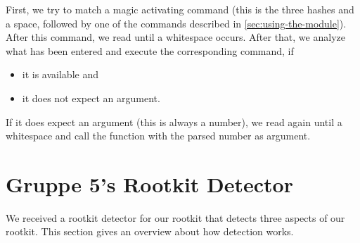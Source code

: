 \documentclass[10pt, letterpaper]{scrartcl}
\begin{document}
First, we try to match a magic activating command (this is the three hashes and a space, followed by one of the commands described in \autoref{sec:using-the-module}). After this command, we read until a whitespace occurs. After that, we analyze what has been entered and execute the corresponding command, if 

\begin{itemize}
 \item it is available and
 \item it does not expect an argument.
\end{itemize}

If it does expect an argument (this is always a number), we read again until a whitespace and call the function with the parsed number as argument.

\section{Gruppe 5's Rootkit Detector}
\label{sec:detectorofgruppe5}

We received a rootkit detector for our rootkit that detects three aspects of our rootkit. This section gives an overview about how detection works.
\end{document}
